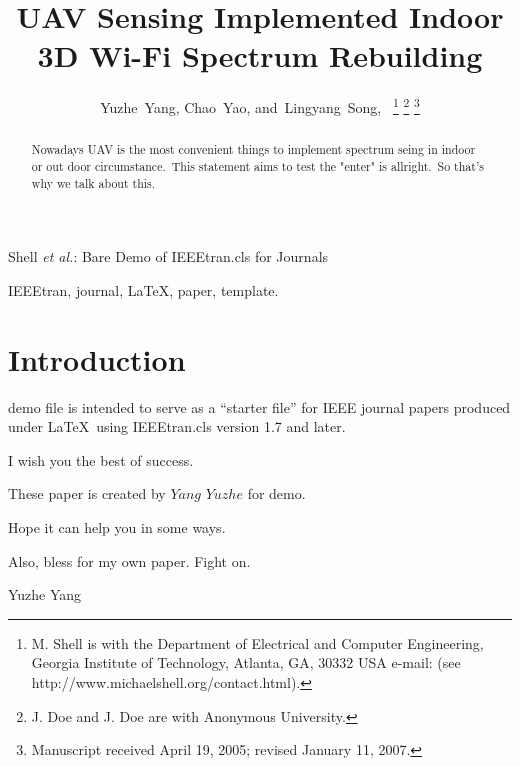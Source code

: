 \documentclass[twocolumn,twoside]{IEEEtran}                 %
\begin{document}
\title{UAV Sensing Implemented Indoor 3D Wi-Fi Spectrum Rebuilding}

\author{Yuzhe~Yang, %
        Chao~Yao, %
        and~Lingyang~Song,~%
\thanks{M. Shell is with the Department
of Electrical and Computer Engineering, Georgia Institute of Technology, Atlanta,
GA, 30332 USA e-mail: (see http://www.michaelshell.org/contact.html).}%
\thanks{J. Doe and J. Doe are with Anonymous University.}%
\thanks{Manuscript received April 19, 2005; revised January 11, 2007.}}

%
{Shell \MakeLowercase{\textit{et al.}}: Bare Demo of IEEEtran.cls for Journals}

\maketitle


\begin{abstract}
Nowadays UAV is the most convenient things to implement spectrum seing in indoor or out door circumstance.\
This statement aims to test the "enter" is allright.\
So that's why we talk about this.
\end{abstract}

\begin{IEEEkeywords}
IEEEtran, journal, \LaTeX, paper, template.
\end{IEEEkeywords}


\section{Introduction}

 demo file is intended to serve as a ``starter file''
for IEEE journal papers produced under \LaTeX\ using
IEEEtran.cls version 1.7 and later.

I wish you the best of success.

These paper is created by $Yang$ $Yuzhe$ for demo.

Hope it can help you in some ways.

Also, bless for my own paper. Fight on.

\hfill Yuzhe Yang
\end{document}
